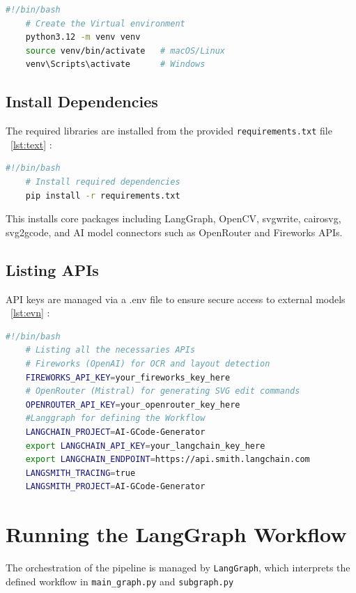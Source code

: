 \begin{lstlisting}[language=bash,caption={Create Virtual Environment}, label={lst:Python}]
	#!/bin/bash
	# Create the Virtual environment
	python3.12 -m venv venv
	source venv/bin/activate   # macOS/Linux
	venv\Scripts\activate      # Windows
\end{lstlisting}

\subsection{Install Dependencies}
The required libraries are installed from the provided \texttt{requirements.txt} file ~\ref{lst:text} :

\begin{lstlisting}[language=bash,caption={Install Dependencies}, label={lst:text}]
	#!/bin/bash
	# Install required dependencies
	pip install -r requirements.txt
\end{lstlisting}

This installs core packages including LangGraph, OpenCV, svgwrite, cairosvg, svg2gcode, and AI model connectors such as OpenRouter and Fireworks APIs.

\subsection{Listing APIs}
API keys are managed via a .env file to ensure secure access to external models ~\ref{lst:evn} :

\begin{lstlisting}[language=bash,caption={APIs Listing}, label={lst:evn}]
	#!/bin/bash
	# Listing all the necessaries APIs
	# Fireworks (OpenAI) for OCR and layout detection
	FIREWORKS_API_KEY=your_fireworks_key_here
	# OpenRouter (Mistral) for generating SVG edit commands
	OPENROUTER_API_KEY=your_openrouter_key_here
	#Langgraph for defining the Workflow
	LANGCHAIN_PROJECT=AI-GCode-Generator
	export LANGCHAIN_API_KEY=your_langchain_key_here
	export LANGCHAIN_ENDPOINT=https://api.smith.langchain.com
	LANGSMITH_TRACING=true
	LANGSMITH_PROJECT=AI-GCode-Generator
\end{lstlisting}

\section{Running the LangGraph Workflow}
The orchestration of the pipeline is managed by \texttt{LangGraph}, which interprets the defined workflow in \texttt{main\_graph.py} and \texttt{subgraph.py}

